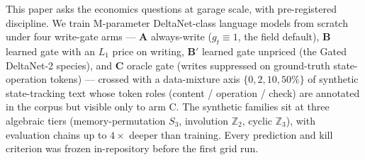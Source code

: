 \documentclass[10pt]{article}
\newcommand{\gt}{g_t}
\begin{document}
This paper asks the economics questions at garage scale, with pre-registered discipline. We train
\tgParamsM{}M-parameter DeltaNet-class language models from scratch under four write-gate arms ---
\textbf{A} always-write ($\gt\equiv 1$, the field default), \textbf{B} learned gate with an $L_1$
price on writing, \textbf{B$'$} learned gate unpriced (the Gated DeltaNet-2 species), and \textbf{C}
oracle gate (writes suppressed on ground-truth state-operation tokens) --- crossed with a
data-mixture axis $\{0,2,10,50\%\}$ of synthetic state-tracking text whose token roles
(content / operation / check) are annotated in the corpus but visible only to arm C. The synthetic
families sit at three algebraic tiers (memory-permutation $S_3$, involution $\mathbb{Z}_2$, cyclic
$\mathbb{Z}_3$), with evaluation chains up to $4\times$ deeper than training. Every prediction and
kill criterion was frozen in-repository before the first grid run.
\end{document}
